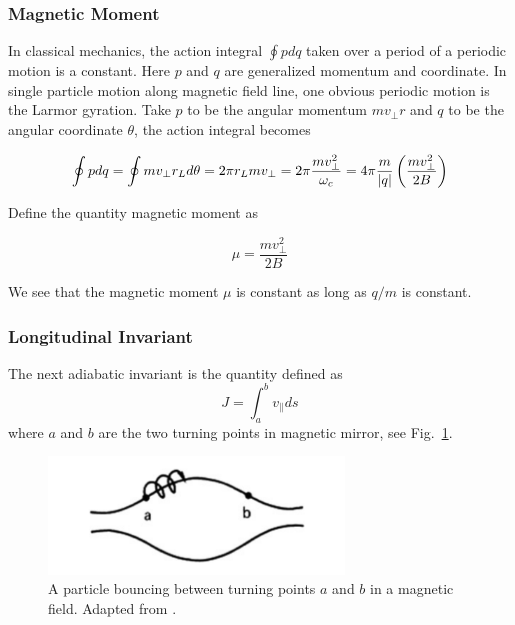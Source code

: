 \subsubsection*{Magnetic Moment}
In classical mechanics, the action integral $\oint pdq$ taken over a period of a periodic motion is a constant. Here $p$ and $q$ are generalized momentum and coordinate. In single particle motion along magnetic field line, one obvious periodic motion is the Larmor gyration. Take $p$ to be the angular momentum $mv_\perp r$ and $q$ to be the angular coordinate $\theta$, the action integral becomes

\begin{equation}
	\oint pdq = \oint mv_\perp r_L d\theta = 2\pi r_L mv_\perp = 2\pi \frac{mv_\perp^2}{\omega_c} = 4\pi\frac{m}{\abs{q}}\left(\frac{mv_\perp^2}{2B}\right)
\end{equation}

Define the quantity magnetic moment as

\begin{equation}
	\mu = \frac{mv_\perp^2}{2B}
\end{equation}

We see that the magnetic moment $\mu$ is constant as long as $q/m$ is constant.

\subsubsection*{Longitudinal Invariant}
The next adiabatic invariant is the quantity defined as \cite{chen_introduction_2016}
\begin{equation}
	J=\int_a^b v_\parallel ds
\end{equation}
where $a$ and $b$ are the two turning points in magnetic mirror, see Fig.~\ref{fig:particle-in-mirror}.

\begin{figure}[htbp]
	\centering
	\includegraphics[width=0.7\textwidth]{figures/particle-in-mirror.png}
	\caption{A particle bouncing between turning points $a$ and $b$ in a magnetic field. Adapted from \cite{chen_introduction_2016}.}
	\label{fig:particle-in-mirror}
\end{figure}


